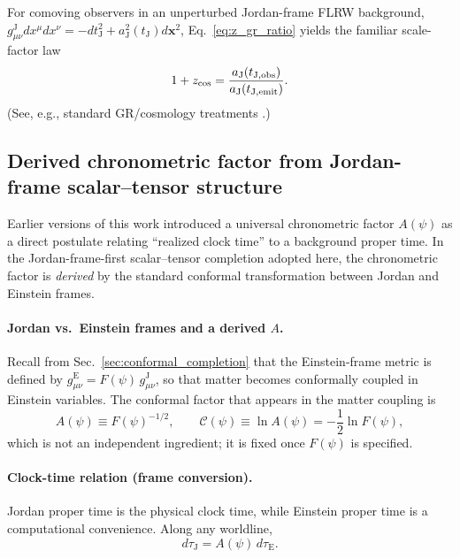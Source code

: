 \documentclass[10pt]{article}
\newcommand{\gJ}{g^{\mathrm{J}}}        %
\newcommand{\gE}{g^{\mathrm{E}}}        %
\newcommand{\aJ}{a_{\mathrm{J}}}
\newcommand{\tJ}{t_{\mathrm{J}}}
\newcommand{\Fpsi}{F(\psi)}
\newcommand{\Apsi}{A(\psi)}
\newcommand{\Cpsi}{\mathcal{C}(\psi)} %
\begin{document}
For comoving observers in an unperturbed Jordan-frame FLRW background,
\(\gJ_{\mu\nu}dx^\mu dx^\nu = -d\tJ^2 + \aJ^2(\tJ)d\bm{x}^2\),
Eq.~\eqref{eq:z_gr_ratio} yields the familiar scale-factor law
\begin{equation}
1+z_{\rm cos}=\frac{\aJ(t_{{\rm J,obs}})}{\aJ(t_{{\rm J,emit}})}.
\label{eq:z_cos_flrw}
\end{equation}
(See, e.g., standard GR/cosmology treatments \cite{Wald1984GR}.)

\subsection{Derived chronometric factor from Jordan-frame scalar--tensor structure}
\label{sec:photon_transport_chrono}

Earlier versions of this work introduced a universal chronometric factor \(A(\psi)\) as a direct
postulate relating ``realized clock time'' to a background proper time. In the Jordan-frame-first
scalar--tensor completion adopted here, the chronometric factor is \emph{derived} by the standard
conformal transformation between Jordan and Einstein frames.

\paragraph{Jordan vs.\ Einstein frames and a derived \(A\).}
Recall from Sec.~\ref{sec:conformal_completion} that the Einstein-frame metric is defined by
\(\gE_{\mu\nu}=\Fpsi\,\gJ_{\mu\nu}\), so that matter becomes conformally coupled in Einstein variables.
The conformal factor that appears in the matter coupling is
\begin{equation}
\Apsi \equiv \Fpsi^{-1/2},
\qquad
\Cpsi \equiv \ln \Apsi = -\frac{1}{2}\ln \Fpsi,
\label{eq:clk_factor_main}
\end{equation}
which is not an independent ingredient; it is fixed once \(F(\psi)\) is specified.

\paragraph{Clock-time relation (frame conversion).}
Jordan proper time is the physical clock time, while Einstein proper time is a computational
convenience. Along any worldline,
\begin{equation}
d\tau_{\mathrm{J}} = \Apsi\, d\tau_{\mathrm{E}}.
\label{eq:nu_meas_main}
\end{equation}
\end{document}

